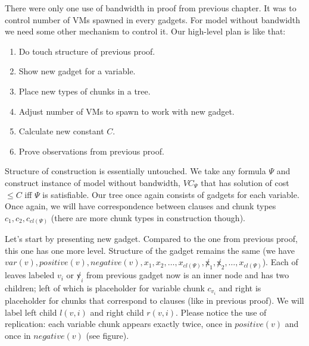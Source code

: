 There were only one use of bandwidth in proof from previous
chapter. It was to control number of VMs spawned in every gadgets. For
model without bandwidth we need some other mechanism to control
it. Our high-level plan is like that:
\begin{enumerate}
\item Do touch structure of previous proof.
\item Show new gadget for a variable.
\item Place new types of chunks in a tree.
\item Adjust number of VMs to spawn to work with new gadget.
\item Calculate new constant $C$.
\item Prove observations from previous proof. 
\end{enumerate}

Structure of construction is essentially untouched. We take any
formula $\Psi$ and construct instance of model without bandwidth,
$VC_{\Psi}$ that has solution of cost $\leq C$ iff $\Psi$ is
satisfiable. Our tree once again consists of gadgets for each
variable. Once again, we will have correspondence between clauses and
chunk types $c_1, c_2, c_{cl(\Psi)}$ (there are more chunk types in
construction though).

Let's start by presenting new gadget. Compared to the one from
previous proof, this one has one more level. Structure of the gadget
remains the same (we have $var(v), positive(v), negative(v), x_1,
x_2, \ldots, x_{cl(\Psi)}, \not x_1, \not x_2, \ldots,
x_{cl(\Psi)}$). Each of leaves labeled $v_i$ or $\not v_i$ from previous gadget now is an inner
node and has two children; left of which is placeholder for variable chunk $c_{v_i}$ and
right is placeholder for chunks that correspond to clauses (like in
previous proof). We will label left child $l(v, i)$ and right child
$r(v, i)$. Please notice the use of replication: each variable
chunk appears exactly twice, once in $positive(v)$ and once in
$negative(v)$ (see figure).

